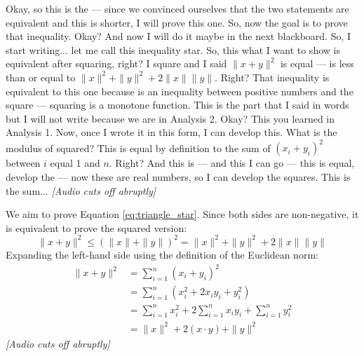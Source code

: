 \begin{spoken-clean}[00:29:18 - 00:31:17]
Okay, so this is the --- since we convinced ourselves that the two statements are equivalent and this is shorter, I will prove this one. So, now the goal is to prove that inequality. Okay? And now I will do it maybe in the next blackboard.  So, I start writing... let me call this inequality star.  So, this what I want to show is equivalent after squaring, right? I square and I said $\|x + y\|^2$ is equal --- is less than or equal to $\|x\|^2 + \|y\|^2 + 2\|x\|\|y\|$. Right?  That inequality is equivalent to this one because is an inequality between positive numbers and the square --- squaring is a monotone function. This is the part that I said in words but I will not write because we are in Analysis 2. Okay? This you learned in Analysis 1. Now, once I wrote it in this form, I can develop this. What is the modulus of squared? This is equal by definition to the sum of $(x_i + y_i)^2$ between $i$ equal 1 and $n$. Right?  And this is --- and this I can go --- this is equal, develop the --- now these are real numbers, so I can develop the squares. This is the sum... \textit{[Audio cuts off abruptly]}
\end{spoken-clean}

\begin{math-stroke}
\begin{ai-proof-skeleton-invisible-content}
\end{ai-proof-skeleton-invisible-content}
We aim to prove Equation \ref{eq:triangle_star}. Since both sides are non-negative, it is equivalent to prove the squared version:
\[ \|x + y\|^2 \le (\|x\| + \|y\|)^2 = \|x\|^2 + \|y\|^2 + 2\|x\|\|y\| \]
Expanding the left-hand side using the definition of the Euclidean norm:
\begin{align*}
\|x + y\|^2 &= \sum_{i=1}^n (x_i + y_i)^2 \\
&= \sum_{i=1}^n (x_i^2 + 2x_i y_i + y_i^2) \\
&= \sum_{i=1}^n x_i^2 + 2\sum_{i=1}^n x_i y_i + \sum_{i=1}^n y_i^2 \\
&= \|x\|^2 + 2(x \cdot y) + \|y\|^2
\end{align*}
\textit{[Audio cuts off abruptly]}
\end{math-stroke}

